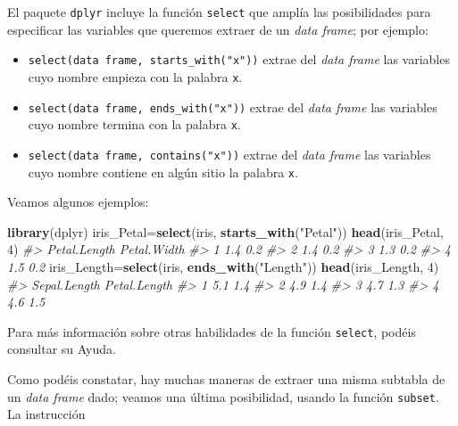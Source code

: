 \documentclass[
]{book}
\newenvironment{Shaded}{\begin{snugshade}}{\end{snugshade}}
\newcommand{\CommentTok}[1]{\textcolor[rgb]{0.56,0.35,0.01}{\textit{#1}}}
\newcommand{\DecValTok}[1]{\textcolor[rgb]{0.00,0.00,0.81}{#1}}
\newcommand{\KeywordTok}[1]{\textcolor[rgb]{0.13,0.29,0.53}{\textbf{#1}}}
\newcommand{\NormalTok}[1]{#1}
\newcommand{\StringTok}[1]{\textcolor[rgb]{0.31,0.60,0.02}{#1}}
\providecommand{\tightlist}{%
  \setlength{\itemsep}{0pt}\setlength{\parskip}{0pt}}
\theoremstyle{definition}
\theoremstyle{definition}
\theoremstyle{definition}
\theoremstyle{remark}
\begin{document}
El paquete \texttt{dplyr} incluye la función \texttt{select} que amplía las posibilidades para especificar las variables que queremos extraer de un \emph{data frame}; por ejemplo:

\begin{itemize}
\tightlist
\item
  \texttt{select(data\ frame,\ starts\_with("x"))} extrae del \emph{data frame} las variables cuyo nombre empieza con la palabra \texttt{x}.
\item
  \texttt{select(data\ frame,\ ends\_with("x"))} extrae del \emph{data frame} las variables cuyo nombre termina con la palabra \texttt{x}.
\item
  \texttt{select(data\ frame,\ contains("x"))} extrae del \emph{data frame} las variables cuyo nombre contiene en algún sitio la palabra \texttt{x}.
\end{itemize}

Veamos algunos ejemplos:

\begin{Shaded}
\begin{Highlighting}[]
\KeywordTok{library}\NormalTok{(dplyr)}
\NormalTok{iris\_Petal=}\KeywordTok{select}\NormalTok{(iris, }\KeywordTok{starts\_with}\NormalTok{(}\StringTok{"Petal"}\NormalTok{)) }
\KeywordTok{head}\NormalTok{(iris\_Petal, }\DecValTok{4}\NormalTok{)}
\CommentTok{\#\textgreater{}   Petal.Length Petal.Width}
\CommentTok{\#\textgreater{} 1          1.4         0.2}
\CommentTok{\#\textgreater{} 2          1.4         0.2}
\CommentTok{\#\textgreater{} 3          1.3         0.2}
\CommentTok{\#\textgreater{} 4          1.5         0.2}
\NormalTok{iris\_Length=}\KeywordTok{select}\NormalTok{(iris, }\KeywordTok{ends\_with}\NormalTok{(}\StringTok{"Length"}\NormalTok{))}
\KeywordTok{head}\NormalTok{(iris\_Length, }\DecValTok{4}\NormalTok{)}
\CommentTok{\#\textgreater{}   Sepal.Length Petal.Length}
\CommentTok{\#\textgreater{} 1          5.1          1.4}
\CommentTok{\#\textgreater{} 2          4.9          1.4}
\CommentTok{\#\textgreater{} 3          4.7          1.3}
\CommentTok{\#\textgreater{} 4          4.6          1.5}
\end{Highlighting}
\end{Shaded}

Para más información sobre otras habilidades de la función \texttt{select}, podéis consultar su Ayuda.

Como podéis constatar, hay muchas maneras de extraer una misma subtabla de un \emph{data frame} dado; veamos una última posibilidad, usando la función \texttt{subset}. La instrucción
\end{document}
